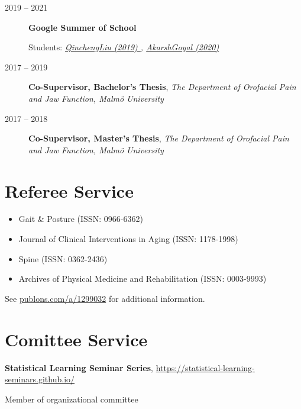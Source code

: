 \documentclass[
  10pt,
  headsepline=true,
  english,
  DIV=12
]{scrartcl}
\renewcommand*{%
  \mkbibnamegiven
}[1]{\ifitemannotation{highlight}{\textbf{#1}}{#1}}
\renewcommand*{%
  \mkbibnamefamily
}[1]{\ifitemannotation{highlight}{\textbf{#1}}{#1}}
\begin{document}
\begin{description}
  \item[2019 -- 2021]{
        \textbf{Google Summer of School}

        Students:
        \emph{
          \href{
            https://summerofcode.withgoogle.com/archive/2019/projects/4654960430546944/
          }{
            QinchengLiu (2019)
          },
          \href{
            https://summerofcode.withgoogle.com/dashboard/project/5459519376719872/overview
          }{
            AkarshGoyal (2020)
          }
        } }
  \item[2017 -- 2019] {
        \textbf{Co-Supervisor, Bachelor's Thesis}, \emph{The Department of
          Orofacial Pain and Jaw Function, Malmö University}

        }
  \item[2017 -- 2018] {
        \textbf{Co-Supervisor, Master's Thesis}, \emph{The Department of
          Orofacial Pain and Jaw Function, Malmö University}

        }
\end{description}

\hypertarget{reviewer}{%
  \section{Referee Service}\label{reviewer}}

\begin{itemize}
  \item Gait \& Posture (ISSN: 0966-6362)
  \item Journal of Clinical Interventions in Aging (ISSN: 1178-1998)
  \item Spine (ISSN: 0362-2436)
  \item Archives of Physical Medicine and Rehabilitation (ISSN: 0003-9993)
\end{itemize}
See \href{http://publons.com/a/1299032}{publons.com/a/1299032} for
additional information.

\section{Comittee Service}
\begin{description}[
    labelwidth = \widthof{2020} + 1em,
    leftmargin = \widthof{2020} + 1em,
  ]
  \item[2020]{
        \textbf{Statistical Learning Seminar Series},
        \url{https://statistical-learning-seminars.github.io/}

        Member of organizational committee
        }
\end{description}
\end{document}
